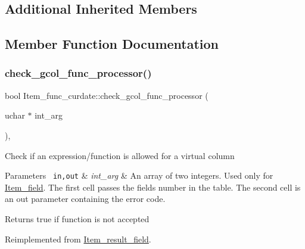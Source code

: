 \subsection*{Additional Inherited Members}


\subsection{Member Function Documentation}
\mbox{\label{classItem__func__curdate_abdf88efdcbd4bf821e4577dcd7765bb9}} 
\subsubsection{\texorpdfstring{check\+\_\+gcol\+\_\+func\+\_\+processor()}{check\_gcol\_func\_processor()}}
{\footnotesize\ttfamily bool Item\+\_\+func\+\_\+curdate\+::check\+\_\+gcol\+\_\+func\+\_\+processor (\begin{DoxyParamCaption}\item[{uchar $\ast$}]{int\+\_\+arg }\end{DoxyParamCaption})\hspace{0.3cm}{\ttfamily [inline]}, {\ttfamily [virtual]}}

Check if an expression/function is allowed for a virtual column


\begin{DoxyParams}[1]{Parameters}
\mbox{\texttt{ in,out}}  & {\em int\+\_\+arg} & An array of two integers. Used only for \mbox{\hyperlink{classItem__field}{Item\+\_\+field}}. The first cell passes the field\textquotesingle{}s number in the table. The second cell is an out parameter containing the error code.\\
\hline
\end{DoxyParams}
\begin{DoxyReturn}{Returns}
true if function is not accepted 
\end{DoxyReturn}


Reimplemented from \mbox{\hyperlink{classItem__result__field_a12324702e7f419b47de45e3505730441}{Item\+\_\+result\+\_\+field}}.

\mbox{\label{classItem__func__curdate_a9c3b90cb34f741de0795ca7908377ce0}} 
